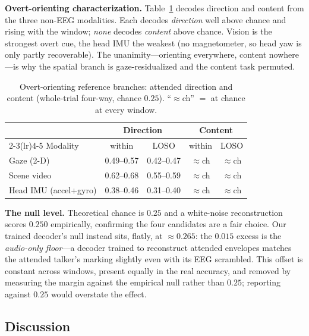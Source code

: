 \documentclass[journal]{IEEEtran}
\newcommand{\chance}{0.25}
\begin{document}
\textbf{Overt-orienting characterization.} Table~\ref{tab:overt} decodes direction and
content from the three non-EEG modalities. Each decodes \emph{direction} well above
chance and rising with the window; \emph{none} decodes \emph{content} above chance.
Vision is the strongest overt cue, the head IMU the weakest (no magnetometer, so head
yaw is only partly recoverable). The unanimity---orienting everywhere, content
nowhere---is why the spatial branch is gaze-residualized and the content task
permuted.

\begin{table}[t]
\centering
\caption{Overt-orienting reference branches: attended direction and content
(whole-trial four-way, chance $\chance$). ``$\approx$ch'' $=$ at chance at every window.}
\label{tab:overt}
\small
\begin{tabular}{@{}lcccc@{}}
\toprule
& \multicolumn{2}{c}{Direction} & \multicolumn{2}{c}{Content}\\
\cmidrule(lr){2-3}\cmidrule(lr){4-5}
Modality & within & LOSO & within & LOSO \\
\midrule
Gaze (2-D)            & 0.49--0.57 & 0.42--0.47 & $\approx$ch & $\approx$ch \\
Scene video           & 0.62--0.68 & 0.55--0.59 & $\approx$ch & $\approx$ch \\
Head IMU (accel+gyro) & 0.38--0.46 & 0.31--0.40 & $\approx$ch & $\approx$ch \\
\bottomrule
\end{tabular}
\end{table}

\textbf{The null level.} Theoretical chance is $\chance$ and a white-noise
reconstruction scores $0.250$ empirically, confirming the four candidates are a fair
choice. Our trained decoder's null instead sits, flatly, at $\approx\!0.265$: the
$0.015$ excess is the \emph{audio-only floor}---a decoder trained to reconstruct
attended envelopes matches the attended talker's marking slightly even with its EEG
scrambled. This offset is constant across windows, present equally in the real
accuracy, and removed by measuring the margin against the empirical null rather than
$\chance$; reporting against $\chance$ would overstate the effect.

\subsection{Discussion}
\label{sec:bench-discussion}
\end{document}
